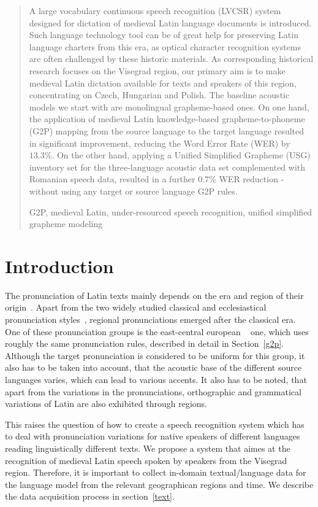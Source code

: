 \documentclass[runningheads,a4paper]{llncs}
\newcommand{\keywords}[1]{\par\addvspace\baselineskip
\noindent\keywordname\enspace\ignorespaces#1}
\begin{document}
%
%
%
%
\begin{abstract}
A large vocabulary continuous speech recognition (LVCSR) system designed for dictation of medieval Latin language documents is introduced.
Such language technology tool can be of great help for preserving Latin language charters from this era, as optical character recognition systems are often challenged by these historic materials.
As corresponding historical research focuses on the Visegrad region, our primary aim is to make medieval Latin dictation available for texts and speakers of this region, concentrating on Czech, Hungarian and Polish.
The baseline acoustic models we start with are monolingual grapheme-based ones. 
On one hand, the application of medieval Latin knowledge-based grapheme-to-phoneme (G2P) mapping from the source language to the target language resulted in significant improvement, reducing the Word Error Rate (WER) by $13.3\%$. 
On the other hand, applying a Unified Simplified Grapheme (USG) inventory set for the three-language acoustic data set complemented with Romanian speech data, resulted in a further $0.7\%$ WER reduction - without using any target or source language G2P rules.
\keywords{G2P, medieval Latin, under-resourced speech recognition, unified simplified grapheme modeling}
\end{abstract}

\section{Introduction}
The pronunciation of Latin texts mainly depends on the era and region of their origin~\cite{regional}.
Apart from the two widely studied classical and ecclesiastical pronunciation styles~\cite{allen78}, regional pronunciations emerged after the classical era.
One of these pronunciation groups is the east-central european ~\cite{regional} one, which uses roughly the same pronunciation rules, described in detail in Section~\ref{g2p}.
Although the target pronunciation is considered to be uniform for this group, it also has to be taken into account, that the acoustic base of the different source languages varies, which can lead to various accents.
It also has to be noted, that apart from the variations in the pronunciations, orthographic and grammatical variations of Latin are also exhibited through regions.

This raises the question of how to create a speech recognition system which has to deal with pronunciation variations for native speakers of different languages reading linguistically different texts.
We propose a system that aimes at the recognition of medieval Latin speech spoken by speakers from the Visegrad region.
Therefore, it is important to collect in-domain textual/language data for the language model from the relevant geographican regions and time.
We describe the data acquisition process in section~\ref{text}.
\end{document}
